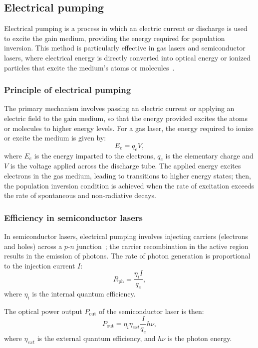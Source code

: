 \documentclass[prl,twocolumn]{revtex4-1}
\begin{document}
\subsection{Electrical pumping}
Electrical pumping is a process in which an electric current or discharge is used to excite the gain medium, providing the energy required for population inversion. This method is particularly effective in gas lasers and semiconductor lasers, where electrical energy is directly converted into optical energy or ionized particles that excite the medium's atoms or molecules~\cite{electrical_pumping}.

\subsubsection{\textbf{Principle of electrical pumping}}
The primary mechanism involves passing an electric current or applying an electric field to the gain medium, so that the energy provided excites the atoms or molecules to higher energy levels. For a gas laser, the energy required to ionize or excite the medium is given by:
%
\begin{equation}
    E_e = q_e V,
\end{equation}
%
where $E_e$ is the energy imparted to the electrons, $q_e$ is the elementary charge and $V$ is the voltage applied across the discharge tube. The applied energy excites electrons in the gas medium, leading to transitions to higher energy states; then, the population inversion condition is achieved when the rate of excitation exceeds the rate of spontaneous and non-radiative decays.

\subsubsection{\textbf{Efficiency in semiconductor lasers}}
In semiconductor lasers, electrical pumping involves injecting carriers (electrons and holes) across a $p$-$n$ junction~\cite{Coldren2012}; the carrier recombination in the active region results in the emission of photons. The rate of photon generation is proportional to the injection current $I$:
%
\begin{equation}
    R_{\text{ph}} = \frac{\eta_i I}{q_e},
\end{equation}
%
where $\eta_i$ is the internal quantum efficiency.

The optical power output $P_{\text{out}}$ of the semiconductor laser is then:
%
\begin{equation}
    P_{\text{out}} = \eta_i \eta_{ext} \frac{I}{q_e} h \nu,
\end{equation}
where $\eta_{ext}$ is the external quantum efficiency, and $h \nu$ is the photon energy.
\end{document}
